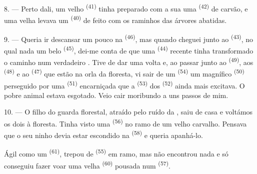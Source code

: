 8. --- Perto dali, um velho  \textsuperscript{(41)} tinha
preparado com a sua  uma  \textsuperscript{(42)} de carvão,
e uma velha levava um  \textsuperscript{(40)} de  feito com os raminhos das árvores abatidas.

\VUsaut{3.0mm}
\VUsaut{3.0mm}

9. --- Queria ir descansar um pouco na 
\textsuperscript{(46)}, mas quando cheguei junto ao 
\textsuperscript{(43)}, no qual nada um belo  \textsuperscript{(45)},
dei-me conta de que uma  \textsuperscript{(44)} recente tinha
transformado o caminho num verdadeiro . Tive de dar uma
volta e, ao passar junto ao  \textsuperscript{(49)}, aos
 \textsuperscript{(48)} e ao  \textsuperscript{(47)} que estão
na orla da floresta, vi sair de um  \textsuperscript{(54)} um
magnífico  \textsuperscript{(50)} perseguido por uma 
\textsuperscript{(51)} encarniçada que a  \textsuperscript{(53)} dos
 \textsuperscript{(52)} ainda mais excitava. O pobre
animal estava esgotado. Veio cair moribundo a uns passos de mim.

10. --- O filho do guarda florestal, atraído pelo ruído da
, saiu de casa e voltámos os dois à floresta. Tinha
visto uma  \textsuperscript{(56)} no ramo de um velho carvalho.
Pensava que o seu ninho devia estar escondido na 
\textsuperscript{(58)} e queria apanhá-lo.

Ágil como um  \textsuperscript{(61)}, trepou de 
\textsuperscript{(55)} em ramo, mas não encontrou nada e só conseguiu fazer voar
uma velha  \textsuperscript{(60)} pousada num 
\textsuperscript{(57)}.
\VUsaut{4.0mm}
\VUfilet{22mm}
